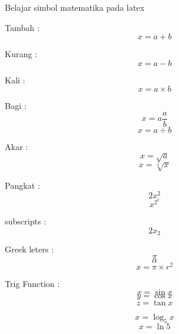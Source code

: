 \documentclass[12pt]{article}
\begin{document}
	Belajar simbol matematika pada latex
	
	Tambah : 
	$$ x = a + b$$
	
	Kurang : 
	$$ x = a - b $$
	
	Kali : 
	$$ x = a \times b $$
	
	Bagi : 
	$$ x = a \frac{a}{b} $$
	$$ x = a\div b $$
	
	Akar :
	$$ x = \sqrt{a}$$
	$$ x = \sqrt[2]{x}$$
	
	Pangkat : 
	$$ 2x^{2} $$
	$$ x^{2^2} $$
	
	subscripts : 
	$$ 2x_{2}$$
	
	Greek leters : 
	$$\pi$$
	$$\alpha$$
	$$ x = \pi \times r^2 $$
	
	Trig Function : 
	$$ x = \sin{x}$$
	$$ y = \cos x $$
	$$ z = \tan x $$
	
	$$ x = \log_5 {x}$$
	$$ x = \ln 5$$
	
\end{document}
